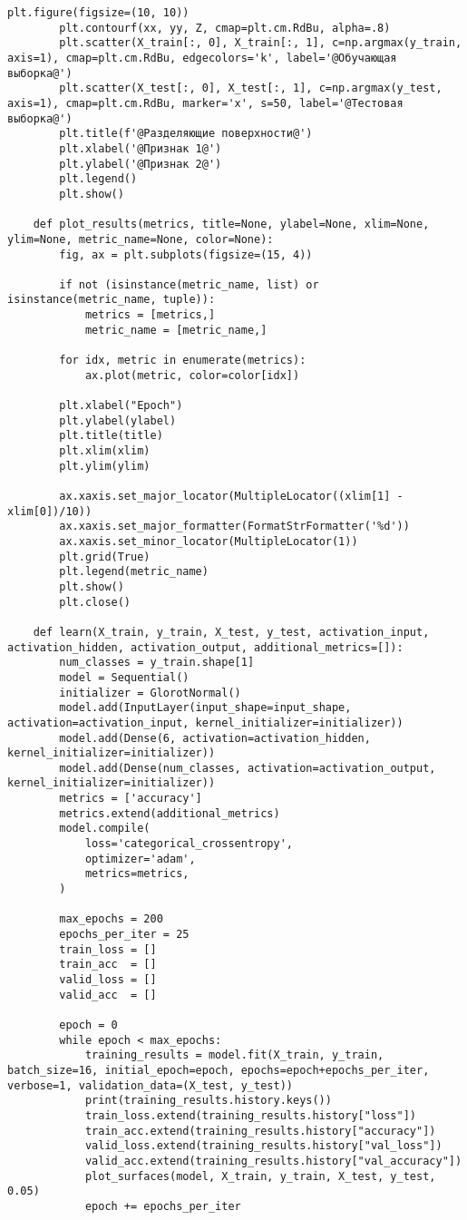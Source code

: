 \begin{lstlisting}[label=lst:1,caption=Классификация с использованием нейросетевого подхода]
		plt.figure(figsize=(10, 10))
		plt.contourf(xx, yy, Z, cmap=plt.cm.RdBu, alpha=.8)
		plt.scatter(X_train[:, 0], X_train[:, 1], c=np.argmax(y_train, axis=1), cmap=plt.cm.RdBu, edgecolors='k', label='@Обучающая выборка@')
		plt.scatter(X_test[:, 0], X_test[:, 1], c=np.argmax(y_test, axis=1), cmap=plt.cm.RdBu, marker='x', s=50, label='@Тестовая выборка@')
		plt.title(f'@Разделяющие поверхности@')
		plt.xlabel('@Признак 1@')
		plt.ylabel('@Признак 2@')
		plt.legend()
		plt.show()
	
	def plot_results(metrics, title=None, ylabel=None, xlim=None, ylim=None, metric_name=None, color=None):
		fig, ax = plt.subplots(figsize=(15, 4))
		
		if not (isinstance(metric_name, list) or isinstance(metric_name, tuple)):
			metrics = [metrics,]
			metric_name = [metric_name,]
		
		for idx, metric in enumerate(metrics):
			ax.plot(metric, color=color[idx])
		
		plt.xlabel("Epoch")
		plt.ylabel(ylabel)
		plt.title(title)
		plt.xlim(xlim)
		plt.ylim(ylim)
		
		ax.xaxis.set_major_locator(MultipleLocator((xlim[1] - xlim[0])/10))
		ax.xaxis.set_major_formatter(FormatStrFormatter('%d'))
		ax.xaxis.set_minor_locator(MultipleLocator(1))
		plt.grid(True)
		plt.legend(metric_name)
		plt.show()
		plt.close()
	
	def learn(X_train, y_train, X_test, y_test, activation_input, activation_hidden, activation_output, additional_metrics=[]):
		num_classes = y_train.shape[1]
		model = Sequential()
		initializer = GlorotNormal()
		model.add(InputLayer(input_shape=input_shape, activation=activation_input, kernel_initializer=initializer))
		model.add(Dense(6, activation=activation_hidden, kernel_initializer=initializer))
		model.add(Dense(num_classes, activation=activation_output, kernel_initializer=initializer))
		metrics = ['accuracy']
		metrics.extend(additional_metrics)
		model.compile(
			loss='categorical_crossentropy',
			optimizer='adam',
			metrics=metrics,
		)

		max_epochs = 200
		epochs_per_iter = 25
		train_loss = []
		train_acc  = []
		valid_loss = []
		valid_acc  = []
		
		epoch = 0
		while epoch < max_epochs:
			training_results = model.fit(X_train, y_train, batch_size=16, initial_epoch=epoch, epochs=epoch+epochs_per_iter, verbose=1, validation_data=(X_test, y_test))
			print(training_results.history.keys())
			train_loss.extend(training_results.history["loss"])
			train_acc.extend(training_results.history["accuracy"])
			valid_loss.extend(training_results.history["val_loss"])
			valid_acc.extend(training_results.history["val_accuracy"])
			plot_surfaces(model, X_train, y_train, X_test, y_test, 0.05)
			epoch += epochs_per_iter
		

\end{lstlisting}
